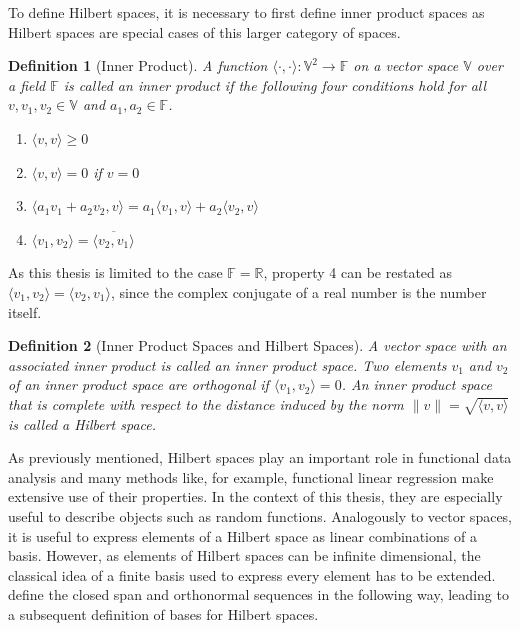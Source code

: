 \documentclass[12pt, a4paper]{article}
\theoremstyle{MAstyle} \newtheorem{assumption}{Assumption}[section]
\theoremstyle{MAstyle} \newtheorem{definition}{Definition}[section]
\theoremstyle{MAstyle} \newtheorem{theorem}{Theorem}[section]
\begin{document}
			To define Hilbert spaces, it is necessary to first define inner product spaces as Hilbert spaces are special cases of this larger category of spaces.
			\begin{definition}[Inner Product]
				A function $\langle \cdot , \cdot \rangle : \mathbb{V}^2 \rightarrow \mathbb{F}$ on a vector space $\mathbb{V}$ over a field $\mathbb{F}$ is called an inner product if the following four conditions hold for all $v, v_1, v_2 \in \mathbb{V}$ and $a_1, a_2 \in \mathbb{F}$.
				\begin{multicols}{2}
					\begin{enumerate}
						\item $\langle v,v \rangle \geq 0$
						\item $\langle v,v \rangle = 0$ if $v = 0$
						\item $\langle a_1 v_1 + a_2 v_2, v \rangle = a_1 \langle v_1, v \rangle + a_2 \langle v_2, v \rangle$
						\item $\langle v_1, v_2 \rangle = \overline{\langle v_2, v_1 \rangle}$
					\end{enumerate}
				\end{multicols}
			\end{definition}
			As this thesis is limited to the case $\mathbb{F} = \mathbb{R}$, property 4 can be restated as $\langle v_1, v_2 \rangle = \langle v_2, v_1 \rangle$, since the complex conjugate of a real number is the number itself.
			
			\begin{definition}[Inner Product Spaces and Hilbert Spaces]
				A vector space with an associated inner product is called an inner product space. Two elements $v_1$ and $v_2$ of an inner product space are orthogonal if $\langle v_1, v_2 \rangle = 0$.
				An inner product space that is complete with respect to the distance induced by the norm $\| v \| = \sqrt{\langle v, v\rangle}$ is called a Hilbert space.
			\end{definition}
			As previously mentioned, Hilbert spaces play an important role in functional data analysis and many methods like, for example, functional linear regression make extensive use of their properties. In the context of this thesis, they are especially useful to describe objects such as random functions.
			Analogously to vector spaces, it is useful to express elements of a Hilbert space as linear combinations of a basis. However, as elements of Hilbert spaces can be infinite dimensional, the classical idea of a finite basis used to express every element has to be extended. \cite{hsing_theoretical_2015} define the closed span and orthonormal sequences in the following way, leading to a subsequent definition of bases for Hilbert spaces.
		
\end{document}
